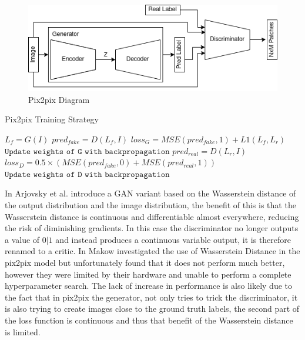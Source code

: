 \documentclass{UoYCSproject}
\begin{document}
\begin{figure}[ht]
    \centering
    \includegraphics[width=\linewidth]{PatchGAN Diagram}
    \caption{Pix2pix Diagram}
    \label{fig:patchGANDiagram}
\end{figure}

\begin{algorithm}
    \caption{Pix2pix Training Strategy}\label{ALG:GAN}
    \begin{algorithmic}[1]
    \State
    \State $L_{f} = G(I)$
    \State
    \State $pred_{fake} = D(L_{f}, I) $
    \State $loss_G = MSE( pred_{fake}, 1 ) + L1(L_{f}, L_{r}) $
    \State $\texttt{Update weights of G with backpropagation}$
    \State
    \State $pred_{real} = D(L_{r}, I)$
    \State $loss_D = 0.5 \times  ( MSE( pred_{fake}, 0) + MSE( pred_{real}, 1) ) $
    \State $\texttt{Update weights of D with backpropagation}$
    \State
    \EndFor
    \EndFor
    \end{algorithmic}
\end{algorithm}
    

In \cite{arjovsky2017wasserstein} Arjovsky et al. introduce a GAN variant based on the Wasserstein distance of the output distribution and the image distribution, the benefit of this is that the Wasserstein distance is continuous and differentiable almost everywhere, reducing the risk of diminishing gradients. In this case the discriminator no longer outputs a value of $0|1$ and instead produces a continuous variable output, it is therefore renamed to a critic. In \cite{pix2pixwasserstein} Makow investigated the use of Wasserstein Distance in the pix2pix model but unfortunately found that it does not perform much better, however they were limited by their hardware and unable to perform a complete hyperparameter search. The lack of increase in performance is also likely due to the fact that in pix2pix the generator, not only tries to trick the discriminator, it is also trying to create images close to the ground truth labels, the second part of the loss function is continuous and thus that benefit of the Wasserstein distance is limited.
\end{document}
